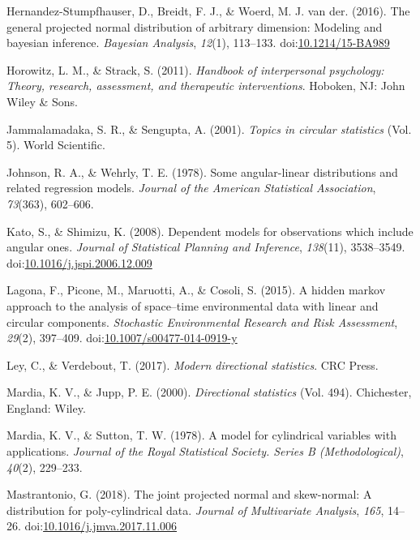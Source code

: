 \documentclass[11pt,]{article}
\begin{document}
\hypertarget{ref-hernandez2016general}{}
Hernandez-Stumpfhauser, D., Breidt, F. J., \& Woerd, M. J. van der.
(2016). The general projected normal distribution of arbitrary
dimension: Modeling and bayesian inference. \emph{Bayesian Analysis},
\emph{12}(1), 113--133.
doi:\href{https://doi.org/10.1214/15-BA989}{10.1214/15-BA989}

\hypertarget{ref-horowitz2010handbook}{}
Horowitz, L. M., \& Strack, S. (2011). \emph{Handbook of interpersonal
psychology: Theory, research, assessment, and therapeutic
interventions}. Hoboken, NJ: John Wiley \& Sons.

\hypertarget{ref-jammalamadaka2001topics}{}
Jammalamadaka, S. R., \& Sengupta, A. (2001). \emph{Topics in circular
statistics} (Vol. 5). World Scientific.

\hypertarget{ref-johnson1978some}{}
Johnson, R. A., \& Wehrly, T. E. (1978). Some angular-linear
distributions and related regression models. \emph{Journal of the
American Statistical Association}, \emph{73}(363), 602--606.

\hypertarget{ref-kato2008dependent}{}
Kato, S., \& Shimizu, K. (2008). Dependent models for observations which
include angular ones. \emph{Journal of Statistical Planning and
Inference}, \emph{138}(11), 3538--3549.
doi:\href{https://doi.org/10.1016/j.jspi.2006.12.009}{10.1016/j.jspi.2006.12.009}

\hypertarget{ref-lagona2015hidden}{}
Lagona, F., Picone, M., Maruotti, A., \& Cosoli, S. (2015). A hidden
markov approach to the analysis of space--time environmental data with
linear and circular components. \emph{Stochastic Environmental Research
and Risk Assessment}, \emph{29}(2), 397--409.
doi:\href{https://doi.org/10.1007/s00477-014-0919-y}{10.1007/s00477-014-0919-y}

\hypertarget{ref-ley2017modern}{}
Ley, C., \& Verdebout, T. (2017). \emph{Modern directional statistics}.
CRC Press.

\hypertarget{ref-mardia2000directional}{}
Mardia, K. V., \& Jupp, P. E. (2000). \emph{Directional statistics}
(Vol. 494). Chichester, England: Wiley.

\hypertarget{ref-mardia1978model}{}
Mardia, K. V., \& Sutton, T. W. (1978). A model for cylindrical
variables with applications. \emph{Journal of the Royal Statistical
Society. Series B (Methodological)}, \emph{40}(2), 229--233.

\hypertarget{ref-mastrantonio2018joint}{}
Mastrantonio, G. (2018). The joint projected normal and skew-normal: A
distribution for poly-cylindrical data. \emph{Journal of Multivariate
Analysis}, \emph{165}, 14--26.
doi:\href{https://doi.org/10.1016/j.jmva.2017.11.006}{10.1016/j.jmva.2017.11.006}
\end{document}
